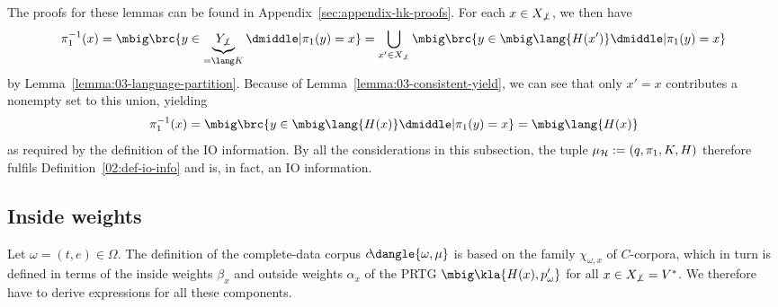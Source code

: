 The proofs for these lemmas can be found in Appendix~\ref{sec:appendix-hk-proofs}. For each $x\in X_{\not\bot}$, we then have
\[
 \pi_1^{-1}(x)
 = \mbig\brc{y\in \underbrace{Y_{\not\bot}}_{=\lang K} \pipe \pi_1(y) = x}
 = \bigcup_{x'\in X_{\not\bot}} \mbig\brc{y\in\mbig\lang{H(x')} \pipe \pi_1(y) = x}
\]
by Lemma~\ref{lemma:03-language-partition}. Because of
Lemma~\ref{lemma:03-consistent-yield}, we can see that only $x'=x$ contributes
a nonempty set to this union, yielding
\[
 \pi_1^{-1}(x) = \mbig\brc{y\in\mbig\lang{H(x)} \pipe \pi_1(y) = x} = \mbig\lang{H(x)}
\]
as required by the definition of the IO information. By all the considerations
in this subsection, the tuple $\mu_\mathcal H := (q,\pi_1,K,H)$ therefore fulfils
Definition~\ref{02:def-io-info} and is, in fact, an IO information.

\subsection{Inside weights}

Let $\omega = (t,e)\in\Omega$. The definition of the complete-data corpus
$c\!\dangle{\omega,\mu}$ is based on the family $\chi_{\omega,x}$ of
$C$-corpora, which in turn is defined in terms of the inside weights $\beta_x$
and outside weights $\alpha_x$ of the PRTG $\mbig\kla{H(x),p_\omega'}$ for all
$x\in X_{\not\bot}=V^*$. We therefore have to derive expressions for all these
components.

